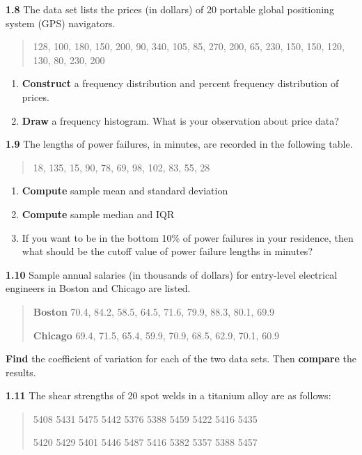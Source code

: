 \documentclass[
  11pt,
  letterpaper,
  DIV=11,
  numbers=noendperiod]{scrreprt}
\begin{document}
\textbf{1.8} The data set lists the prices (in dollars) of 20 portable
global positioning system (GPS) navigators.

\begin{quote}
128, 100, 180, 150, 200, 90, 340, 105, 85, 270, 200, 65, 230, 150, 150,
120, 130, 80, 230, 200
\end{quote}

\begin{enumerate}
\def\labelenumi{\roman{enumi})}
\item
  \textbf{Construct} a frequency distribution and percent frequency
  distribution of prices.
\item
  \textbf{Draw} a frequency histogram. What is your observation about
  price data?
\end{enumerate}

\textbf{1.9} The lengths of power failures, in minutes, are recorded in
the following table.

\begin{quote}
18, 135, 15, 90, 78, 69, 98, 102, 83, 55, 28
\end{quote}

\begin{enumerate}
\def\labelenumi{\roman{enumi})}
\item
  \textbf{Compute} sample mean and standard deviation
\item
  \textbf{Compute} sample median and IQR
\item
  If you want to be in the bottom 10\% of power failures in your
  residence, then what should be the cutoff value of power failure
  lengths in minutes?
\end{enumerate}

\textbf{1.10} Sample annual salaries (in thousands of dollars) for
entry-level electrical engineers in Boston and Chicago are listed.

\begin{quote}
\textbf{Boston} 70.4, 84.2, 58.5, 64.5, 71.6, 79.9, 88.3, 80.1, 69.9

\textbf{Chicago} 69.4, 71.5, 65.4, 59.9, 70.9, 68.5, 62.9, 70.1, 60.9
\end{quote}

\textbf{Find} the coefficient of variation for each of the two data
sets. Then \textbf{compare} the results.

\textbf{1.11} The shear strengths of 20 spot welds in a titanium alloy
are as follows:

\begin{quote}
5408 5431 5475 5442 5376 5388 5459 5422 5416 5435

5420 5429 5401 5446 5487 5416 5382 5357 5388 5457
\end{quote}
\end{document}
